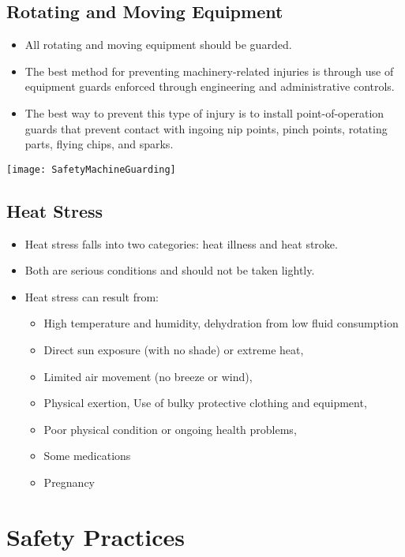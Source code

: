 \subsection{Rotating and Moving Equipment}

\begin{itemize}
\item All rotating and moving equipment should be guarded. 
\item The best method for preventing machinery-related injuries is through use of equipment guards enforced through engineering and administrative controls.   
\item The best way to prevent this type of injury is to install point-of-operation guards that prevent contact with ingoing nip points, pinch points, rotating parts, flying chips, and sparks.
\end{itemize}
\begin{center}
\texttt{[image: SafetyMachineGuarding]}\\
\end{center}

\subsection{Heat Stress}
\begin{itemize}
\item Heat stress falls into two categories: heat illness and heat stroke. 
\item Both are serious conditions and should not be taken lightly. 
\item Heat stress can result from: 
\begin{itemize}
\item High temperature and humidity, dehydration from low fluid consumption
\item Direct sun exposure (with no shade) or extreme heat, 
\item Limited air movement (no breeze or wind), 
\item Physical exertion, Use of bulky protective clothing and equipment, 
\item Poor physical condition or ongoing health problems, 
\item Some medications
\item Pregnancy
\end{itemize}
\end{itemize} 


\section{Safety Practices}
